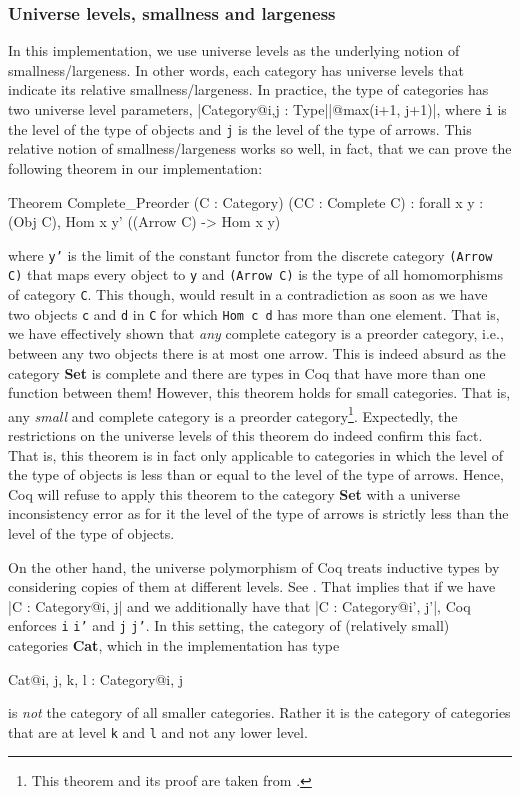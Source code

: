 \documentclass[9pt, twocolumn]{extarticle}
\begin{document}
\subsubsection*{Universe levels, smallness and largeness}
In this implementation, we use universe levels as the underlying notion of smallness/largeness.
In other words, each category has universe levels that indicate its relative smallness/largeness.
In practice, the type of categories has two universe level parameters, \Coqe|Category@{i,j} : Type|\Coqe|@{max(i+1, j+1)}|, where \texttt{i} is the level of the type of objects and \texttt{j} is the level of the type of arrows.
This relative notion of smallness/largeness works so well, in fact, that we can prove the following theorem in our implementation:
\begin{Coq}
Theorem Complete_Preorder (C : Category) (CC : Complete C) :
   forall x y : (Obj C), Hom x y'   ((Arrow C) -> Hom x y)
\end{Coq}
where \texttt{y'} is the limit of the constant functor from the discrete category \texttt{(Arrow C)} that maps every object to \texttt{y} and \texttt{(Arrow C)} is the type of all homomorphisms of category \texttt{C}.
This though, would result in a contradiction as soon as we have two objects \texttt{c} and \texttt{d} in \texttt{C} for which \texttt{Hom c d} has more than one element.
That is, we have effectively shown that \emph{any} complete category is a preorder category, i.e., between any two objects there is at most one arrow.
This is indeed absurd as the category \textbf{Set} is complete and there are types in Coq that have more than one function between them! 
However, this theorem holds for small categories.
That is, any \emph{small} and complete category is a preorder category\footnote{This theorem and its proof are taken from \cite{awodey2010category}.}.
Expectedly, the restrictions on the universe levels of this theorem do indeed confirm this fact.
That is, this theorem is in fact only applicable to categories in which the level of the type of objects is less than or equal to the level of the type of arrows.
Hence, Coq will refuse to apply this theorem to the category \textbf{Set} with a universe inconsistency error as for it the level of the type of arrows is strictly less than the level of the type of objects.

On the other hand, the universe polymorphism of Coq treats inductive types by considering copies of them at different levels. See \cite{DBLP:conf/itp/SozeauT14}.
That implies that if we have \Coqe|C : Category@{i, j}| and we additionally have that \Coqe|C : Category@{i', j'}|, Coq enforces \texttt{i}  \texttt{i'} and \texttt{j}  \texttt{j'}.
In this setting, the category of (relatively small) categories \textbf{Cat}, which in the implementation has type
\begin{Coq}
Cat@{i, j, k, l} : Category@{i, j}
\end{Coq}
is \emph{not} the category of all smaller categories.
Rather it is the category of categories that are at level \texttt{k} and \texttt{l} and not any lower level.
\end{document}
